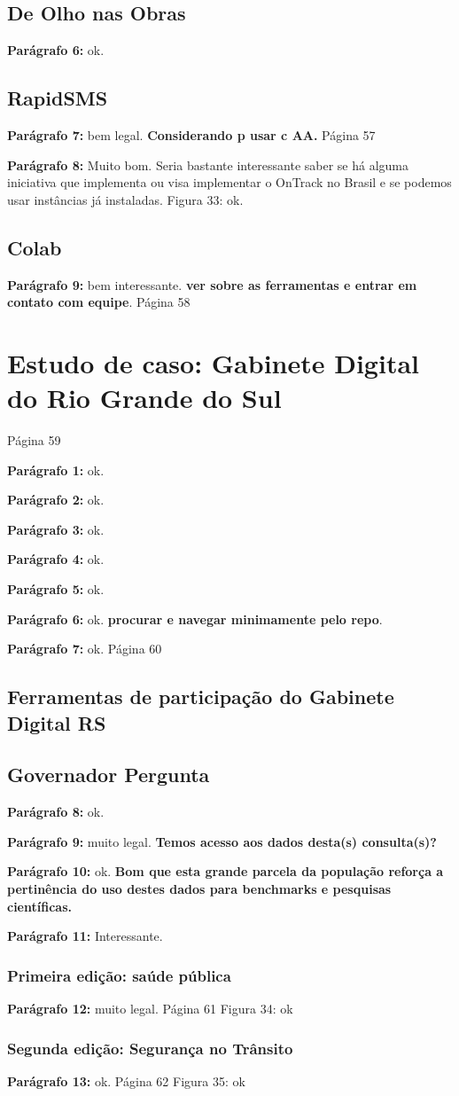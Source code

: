 \documentclass[12pt]{report}
\newcommand{\pp}[1]{

\textbf{Parágrafo #1:}
}
\begin{document}
\subsection{De Olho nas Obras}
\pp{6} ok.
\subsection{RapidSMS}
\pp{7} bem legal. {\bf \color{red} Considerando p usar c AA.}
\noindent Página 57
\pp{8} Muito bom. Seria bastante interessante saber se há alguma iniciativa que implementa ou visa implementar o OnTrack no Brasil e se podemos usar instâncias já instaladas.
Figura 33: ok.
\subsection{Colab}
\pp{9} bem interessante. {\bf \color{red} ver sobre as ferramentas e entrar em contato com equipe}.
\noindent Página 58
\section{Estudo de caso: Gabinete Digital do Rio Grande do Sul}
\noindent Página 59
\pp{1} ok.
\pp{2} ok.
\pp{3} ok.
\pp{4} ok.
\pp{5} ok.
\pp{6} ok. {\bf \color{red} procurar e navegar minimamente pelo repo}.
\pp{7} ok.
\noindent Página 60
\subsection{Ferramentas de participação do Gabinete Digital RS}
\subsection{Governador Pergunta}
\pp{8} ok.
\pp{9} muito legal. {\bf \color{red} Temos acesso aos dados desta(s) consulta(s)?}
\pp{10} ok. {\bf \color{red} Bom que esta grande parcela da população reforça a pertinência do uso destes dados para benchmarks e pesquisas científicas.}
\pp{11} Interessante.
\subsubsection{Primeira edição: saúde pública}
\pp{12} muito legal.
\noindent Página 61
Figura 34: ok
\subsubsection{Segunda edição: Segurança no Trânsito}
\pp{13} ok.
\noindent Página 62
Figura 35: ok
\end{document}
